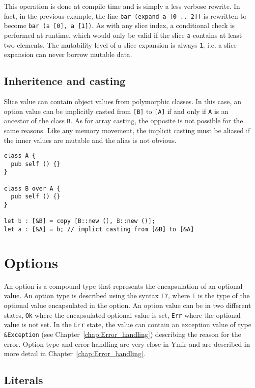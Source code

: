 This operation is done at compile time and is simply a less verbose rewrite. In
fact, in the previous example, the line \texttt{bar (expand a [0 .. 2])} is
rewritten to become \texttt{bar (a [0], a [1])}. As with any slice index, a
conditional check is performed at runtime, which would only be valid if the
slice \texttt{a} contains at least two elements. The mutability level of a slice
expansion is always \texttt{1}, i.e. a slice expansion can never borrow mutable
data.


\subsection{Inheritence and casting}

Slice value can contain object values from polymorphic classes. In this case, an
option value can be implicitly casted from \texttt{[B]} to \texttt{[A]} if and
only if \texttt{A} is an ancestor of the class \texttt{B}. As for array casting,
the opposite is not possible for the same reasons. Like any memory movement, the
implicit casting must be aliased if the inner values are mutable and the alias
is not obvious.

\begin{lstlisting}[style=coloredverbatim]
class A {
  pub self () {}
}

class B over A {
  pub self () {}
}

let b : [&B] = copy [B::new (), B::new ()];
let a : [&A] = b; // implict casting from [&B] to [&A]
\end{lstlisting}

\section{Options}%
\label{sec:options}

An option is a compound type that represents the encapsulation of an optional
value. An option type is described using the syntax \texttt{T?}, where
\texttt{T} is the type of the optional value encapsulated in the option. An
option value can be in two different states, \texttt{Ok} where the encapsulated
optional value is set, \texttt{Err} where the optional value is not set. In the
\texttt{Err} state, the value can contain an exception value of type
\texttt{\&Exception} (see Chapter~\ref{chap:Error_handling}) describing the
reason for the error. Option type and error handling are very close in Ymir and
are described in more detail in Chapter~\ref{chap:Error_handling}.

\subsection{Literals}

